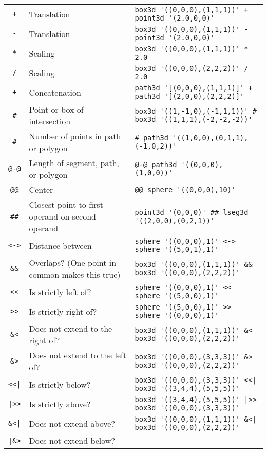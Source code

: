 \documentclass[10pt]{article}
\begin{document}
\begin{landscape}
\begin{center}
\begin{longtable}{|c|l|l|}
\verb!+! & Translation & 
	\verb!box3d '((0,0,0),(1,1,1))' + point3d '(2.0,0,0)'! \\
\verb+-+ & Translation & 
	\verb+box3d '((0,0,0),(1,1,1))' - point3d '(2.0,0,0)'+ \\
\verb+*+ & Scaling & 
	\verb+box3d '((0,0,0),(1,1,1))' * 2.0+ \\
\verb+/+ & Scaling & 
	\verb+box3d '((0,0,0),(2,2,2))' / 2.0+ \\
\verb!+! & Concatenation & 
	\verb!path3d '[(0,0,0),(1,1,1)]' + path3d '[(2,0,0),(2,2,2)]'! \\
\verb+#+ & Point or box of intersection & 
	\verb+box3d '((1,-1,0),(-1,1,1))' # box3d '((1,1,1),(-2,-2,-2))'+ \\
\verb+#+ & Number of points in path or polygon & 
	\verb+# path3d '((1,0,0),(0,1,1),(-1,0,2))'+ \\
\verb+@-@+ & Length of segment, path, or polygon & 
	\verb+@-@ path3d '((0,0,0),(1,0,0))'+ \\
\verb+@@+ & Center & 
	\verb+@@ sphere '((0,0,0),10)'+ \\
\verb+##+ & Closest point to first operand on second operand & 
	\verb+point3d '(0,0,0)' ## lseg3d '((2,0,0),(0,2,1))'+ \\
\verb+<->+ & Distance between & 
	\verb+sphere '((0,0,0),1)' <-> sphere '((5,0,1),1)'+ \\
\verb+&&+ & Overlaps? (One point in common makes this true) & 
	\verb+box3d '((0,0,0),(1,1,1))' && box3d '((0,0,0),(2,2,2))'+ \\
\verb+<<+ & Is strictly left of? & 
	\verb+sphere '((0,0,0),1)' << sphere '((5,0,0),1)'+ \\
\verb+>>+ & Is strictly right of? & 
	\verb+sphere '((5,0,0),1)' >> sphere '((0,0,0),1)'+ \\
\verb+&<+ & Does not extend to the right of?  & 
	\verb+box3d '((0,0,0),(1,1,1))' &< box3d '((0,0,0),(2,2,2))'+ \\
\verb+&>+ & Does not extend to the left of? & 
	\verb+box3d '((0,0,0),(3,3,3))' &> box3d '((0,0,0),(2,2,2))'+ \\
\verb+<<|+ & Is strictly below? & 
	\verb+box3d '((0,0,0),(3,3,3))' <<| box3d '((3,4,4),(5,5,5))'+ \\
\verb+|>>+ & Is strictly above? & 
	\verb+box3d '((3,4,4),(5,5,5))' |>> box3d '((0,0,0),(3,3,3))'+ \\
\verb+&<|+ & Does not extend above? & 
	\verb+box3d '((0,0,0),(1,1,1))' &<| box3d '((0,0,0),(2,2,2))'+ \\
\verb+|&>+ & Does not extend below? & 

\end{longtable}
\end{center}
\end{landscape}
\end{document}
